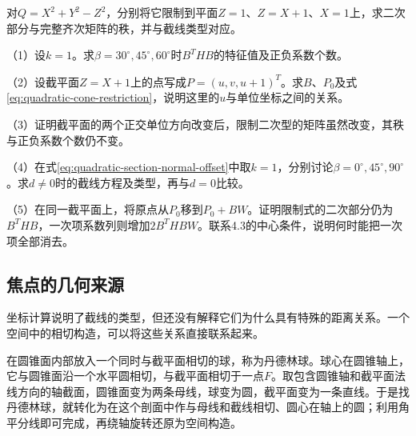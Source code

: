 \begin{example}
对\(Q=X^2+Y^2-Z^2\)，分别将它限制到平面\(Z=1\)、\(Z=X+1\)、\(X=1\)上，求二次部分与完整齐次矩阵的秩，并与截线类型对应。
\end{example}

\begin{exercise}
\mbox{}

\begin{samepage}
（1）设\(k=1\)。求\(\beta=30^\circ,45^\circ,60^\circ\)时\(B^THB\)的特征值及正负系数个数。
\par
\end{samepage}

\begin{samepage}
（2）设截平面\(Z=X+1\)上的点写成\(P=(u,v,u+1)^T\)。求\(B\)、\(P_0\)及式\eqref{eq:quadratic-cone-restriction}，说明这里的\(u\)与单位坐标之间的关系。
\par
\end{samepage}

\begin{samepage}
（3）证明截平面的两个正交单位方向改变后，限制二次型的矩阵虽然改变，其秩与正负系数个数仍不变。
\par
\end{samepage}

\begin{samepage}
（4）在式\eqref{eq:quadratic-section-normal-offset}中取\(k=1\)，分别讨论\(\beta=0^\circ,45^\circ,90^\circ\)。求\(d\ne0\)时的截线方程及类型，再与\(d=0\)比较。
\par
\end{samepage}

\begin{samepage}
（5）在同一截平面上，将原点从\(P_0\)移到\(P_0+BW\)。证明限制式的二次部分仍为\(B^THB\)，一次项系数列则增加\(2B^THBW\)。联系4.3的中心条件，说明何时能把一次项全部消去。
\par
\end{samepage}
\end{exercise}

\subsection{焦点的几何来源}
\label{subsec:quadratic-focus-origins}

坐标计算说明了截线的类型，但还没有解释它们为什么具有特殊的距离关系。一个空间中的相切构造，可以将这些关系直接联系起来。

在圆锥面内部放入一个同时与截平面相切的球，称为{\heiti{}丹德林球}。球心在圆锥轴上，它与圆锥面沿一个水平圆相切，与截平面相切于一点\(F\)。取包含圆锥轴和截平面法线方向的轴截面，圆锥面变为两条母线，球变为圆，截平面变为一条直线。于是找丹德林球，就转化为在这个剖面中作与母线和截线相切、圆心在轴上的圆；利用角平分线即可完成，再绕轴旋转还原为空间构造。

